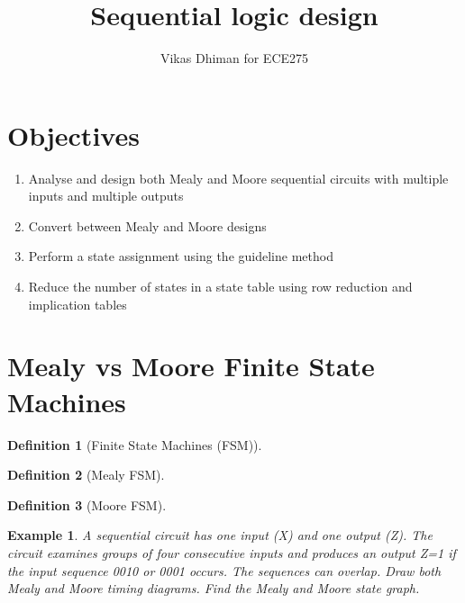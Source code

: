\documentclass{article}
\author{Vikas Dhiman for ECE275}
\title{Sequential logic design}
\newtheorem{example}{Example}
\newtheorem{definition}{Definition}
\begin{document}
\maketitle


\section{Objectives}
\begin{enumerate}
  \item Analyse and design both Mealy and Moore sequential circuits with multiple inputs and multiple outputs
  \item Convert between Mealy and Moore designs
  \item Perform a state assignment using the guideline method
   \item Reduce the number of states in a state table using row reduction and
     implication tables
\end{enumerate}

\section{Mealy vs Moore Finite State Machines}
\begin{definition}[Finite State Machines (FSM)]~\cite[Sec~3.4]{harris2022digital}
\end{definition}
\vspace{5em}

\begin{definition}[Mealy FSM]~\cite[Sec~3.4.3]{harris2022digital}
\end{definition}
\vspace{5em}

\begin{definition}[Moore FSM]~\cite[Sec~3.4.3]{harris2022digital}
\end{definition}
\vspace{5em}


\begin{example}
  A sequential circuit has one input (X) and one output (Z). The circuit
  examines groups of four consecutive inputs and produces an output Z=1 if the
  input sequence 0010 or 0001 occurs. The sequences can overlap. Draw both Mealy
  and Moore timing diagrams. Find the Mealy and Moore state graph.
\end{example}
\vspace{20em}
\end{document}
